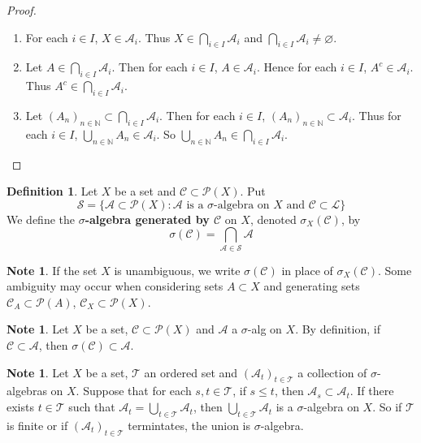 \documentclass{book}
\theoremstyle{definition}
\newtheorem{defn}[definition]{Definition}
\newtheorem{note}[definition]{Note}
\newcommand{\sig}{\sigma}
\newcommand{\N}{\mathbb{N}}
\newcommand{\MA}{\mathcal{A}}
\newcommand{\MC}{\mathcal{C}}
\newcommand{\ML}{\mathcal{L}}
\newcommand{\MP}{\mathcal{P}}
\newcommand{\MS}{\mathcal{S}}
\newcommand{\MT}{\mathcal{T}}
\newcommand{\ld}[1]{\label{defn:#1}}
\DeclareMathOperator*{\0}{\mbf{0}}
\DeclareMathOperator*{\1}{\mbf{1}}
\begin{document}
	\begin{proof}\
		\begin{enumerate}
			\item For each $i \in I$, $X \in \MA_i$. Thus $X \in \bigcap\limits_{i \in I}\MA_i$ and $\bigcap\limits_{i \in I}\MA_i \neq \varnothing$.
			\item Let $A \in \bigcap\limits_{i \in I}\MA_i$. Then for each $i \in I$, $A \in \MA_i$. Hence for each $i \in I$, $A^c \in \MA_i$. Thus $A^c \in \bigcap\limits_{i \in I}\MA_i$. 
			\item Let $(A_n)_{n \in \N} \subset \bigcap\limits_{i \in I}\MA_i$. Then for each $i \in I$, $(A_n)_{n \in \N} \subset \MA_i$. Thus for each $i \in I$, $\bigcup\limits_{n \in \N}A_n \in \MA_i$. So $\bigcup\limits_{n \in \N}A_n \in \bigcap\limits_{i \in I}\MA_i$.
		\end{enumerate}
	\end{proof}
	
	\begin{defn} \ld{00000} 
		Let $X$ be a set and $\MC \subset \MP(X)$. Put $$\MS = \{\MA \subset \MP(X): \MA \text{ is a }\sig\text{-algebra on }X \text{ and } \MC \subset \ML\}$$ We define the \textbf{$\sig$-algebra generated by $\MC$} on $X$, denoted $\sig_X(\MC)$, by $$\sig(\MC) = \bigcap_{\MA \in \MS} \MA $$
	\end{defn}

	\begin{note}
		If the set $X$ is unambiguous, we write $\sig(\MC)$ in place of $\sig_X(\MC)$. Some ambiguity may occur when considering sets $A \subset X$ and generating sets $\MC_A \subset \MP(A)$, $\MC_X \subset \MP(X)$. 
	\end{note}
	
	\begin{note}
		Let $X$ be a set, $\MC \subset \MP(X)$ and $\MA$ a $\sig$-alg on $X$. By definition, if $\MC \subset \MA$, then $\sig(\MC) \subset \MA$.
	\end{note}
	
	\begin{note}
		Let $X$ be a set, $\MT$ an ordered set and $(\MA_t)_{t\in \MT}$ a collection of $\sig$-algebras on $X$. Suppose that for each $s,t \in \MT$, if $s \leq t$, then $\MA_s \subset \MA_t$. If there exists $t \in \MT$ such that $\MA_t = \bigcup\limits_{t \in \MT}\MA_t$, then $\bigcup\limits_{t \in \MT}\MA_t$ is a $\sig$-algebra on $X$. So if $\MT$ is finite or if $(\MA_t)_{t \in \MT}$ termintates, the union is $\sig$-algebra.
	\end{note}
	
\end{document}

